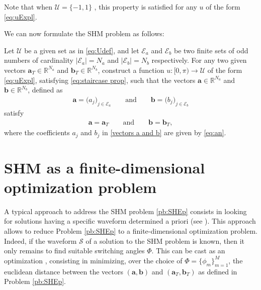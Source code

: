 \documentclass[twocolumn]{autart}    %
\begin{document}
Note that when $\mathcal{U} = \{-1,1\}$ , this property is satisfied for any $u$ of the form \eqref{eq:uExpl}.

We can now formulate the SHM problem as follows:
\newline
\begin{problem}[SHM]\label{pb:SHEp}
Let $\mathcal{U}$ be a given set as in \eqref{eq:Udef}, and let $\mathcal{E} _a $ and $\mathcal{E} _b $ be two finite sets of odd numbers of cardinality $|\mathcal{E}_a| = N_a $ and $ |\mathcal{E} _b| = N_b$ respectively. For any two given vectors $\bm{a}_T \in \mathbb{R}^{N_a}$ and $\bm{b}_T \in \mathbb{R}^{N_b} $, construct a function $u: [0,\pi)\to\mathcal{U}$ of the form \eqref{eq:uExpl}, satisfying \eqref{eq:staircase prop}, such that the vectors $\bm{a} \in \mathbb{R}^{N_a}$ and $\bm{b} \in \mathbb{R}^{N_b}$, defined as
\begin{align}\label{vectors a and b}
	\bm{a} = \big( a_j \big)_{j\in \mathcal{E}_a} \qquad \text{and} \qquad
	\bm{b} = \big( b_j \big)_{j\in \mathcal{E}_b}
\end{align}
satisfy
\begin{align*} 
	\bm{a} = \bm{a}_T \qquad \text{and} \qquad \bm{b} = \bm{b}_T,
\end{align*}
where the coefficients $a_j$ and $b_j$ in \eqref{vectors a and b} are given by \eqref{eq:an}.
\end{problem} 


\section{SHM as a finite-dimensional optimization problem}\label{sec:SHE_finite-dim_pbm}

A typical approach to address the SHM problem \eqref{pb:SHEp} consists in looking for solutions having a specific waveform determined a priori (see \cite{Yang2015,Konstantinou2010,Sun1996}). This approach allows to reduce Problem \ref{pb:SHEp} to a finite-dimensional optimization problem.
Indeed, if the waveform $\mathcal S$ of a solution to the SHM problem is known,  then it only remains to find suitable switching angles $\Phi$. This can be cast as an optimization , consisting in minimizing, over the choice of $\Phi = \{\phi_m\}_{m=1}^{M}$, the euclidean distance between the  vectors $(\bm{a}, \bm{b})$ and $(\bm{a}_T,\bm{b}_T)$ as defined in Problem \ref{pb:SHEp}.
\end{document}
